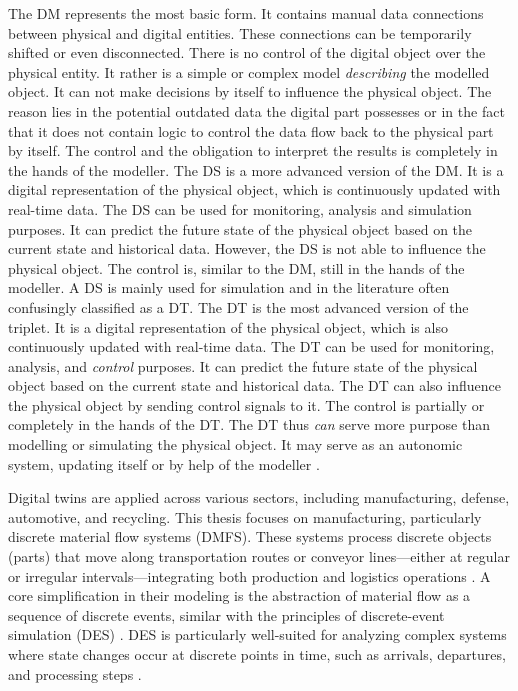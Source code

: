 The DM represents the most basic form. It contains manual data connections between physical and digital entities. These connections can be temporarily shifted or even disconnected. There is no control of the digital object over the physical entity. It rather is a simple or complex model \textit{describing} the modelled object. It can not make decisions by itself to influence the physical object. The reason lies in the potential outdated data the digital part possesses or in the fact that it does not contain logic to control the data flow back to the physical part by itself. The control and the obligation to interpret the results is completely in the hands of the modeller.
The DS is a more advanced version of the DM. It is a digital representation of the physical object, which is continuously updated with real-time data. The DS can be used for monitoring, analysis and simulation purposes. It can predict the future state of the physical object based on the current state and historical data. However, the DS is not able to influence the physical object. The control is, similar to the DM, still in the hands of the modeller. A DS is mainly used for simulation and in the literature often confusingly classified as a DT.
The DT is the most advanced version of the triplet. It is a digital representation of the physical object, which is also continuously updated with real-time data. The DT can be used for monitoring, analysis, and \textit{control} purposes. It can predict the future state of the physical object based on the current state and historical data. The DT can also influence the physical object by sending control signals to it. The control is partially or completely in the hands of the DT. The DT thus \textit{can} serve more purpose than modelling or simulating the physical object. It may serve as an autonomic system, updating itself or by help of the modeller \parencite{kritzinger2018digital}.

Digital twins are applied across various sectors, including manufacturing, defense, automotive, and recycling. This thesis focuses on manufacturing, particularly discrete material flow systems (DMFS). These systems process discrete objects (parts) that move along transportation routes or conveyor lines—either at regular or irregular intervals—integrating both production and logistics operations \parencite{arnold2005materialfluss, schwede2024learning}. A core simplification in their modeling is the abstraction of material flow as a sequence of discrete events, similar with the principles of discrete-event simulation (DES) \parencite{kovacs2016mathematical, robinson2014simulation}. DES is particularly well-suited for analyzing complex systems where state changes occur at discrete points in time, such as arrivals, departures, and processing steps \parencite{robinson2014simulation}.

